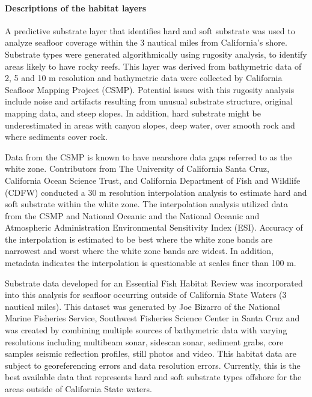 \documentclass[11pt,
  english,
  a4paper,
]{article}
\begin{document}

\hypertarget{descriptions-of-the-habitat-layers}{%
\paragraph{Descriptions of the habitat layers}\label{descriptions-of-the-habitat-layers}}

\leavevmode\tagmcend\tagstructend


A predictive substrate layer that identifies hard and soft substrate was used to analyze seafloor coverage within the 3 nautical miles from California's shore. Substrate types were generated algorithmically using rugosity analysis, to identify areas likely to have rocky reefs. This layer was derived from bathymetric data of 2, 5 and 10 m resolution and bathymetric data were collected by California Seafloor Mapping Project (CSMP). Potential issues with this rugosity analysis include noise and artifacts resulting from unusual substrate structure, original mapping data, and steep slopes. In addition, hard substrate might be underestimated in areas with canyon slopes, deep water, over smooth rock and where sediments cover rock.

\leavevmode\tagmcend\tagstructend\par


Data from the CSMP is known to have nearshore data gaps referred to as the white zone. Contributors from The University of California Santa Cruz, California Ocean Science Trust, and California Department of Fish and Wildlife (CDFW) conducted a 30 m resolution interpolation analysis to estimate hard and soft substrate within the white zone. The interpolation analysis utilized data from the CSMP and National Oceanic and the National Oceanic and Atmospheric Administration Environmental Sensitivity Index (ESI). Accuracy of the interpolation is estimated to be best where the white zone bands are narrowest and worst where the white zone bands are widest. In addition, metadata indicates the interpolation is questionable at scales finer than 100 m.

\leavevmode\tagmcend\tagstructend\par


Substrate data developed for an Essential Fish Habitat Review was incorporated into this analysis for seafloor occurring outside of California State Waters (3 nautical miles). This dataset was generated by Joe Bizarro of the National Marine Fisheries Service, Southwest Fisheries Science Center in Santa Cruz and was created by combining multiple sources of bathymetric data with varying resolutions including multibeam sonar, sidescan sonar, sediment grabs, core samples seismic reflection profiles, still photos and video. This habitat data are subject to georeferencing errors and data resolution errors. Currently, this is the best available data that represents hard and soft substrate types offshore for the areas outside of California State waters.
\end{document}
